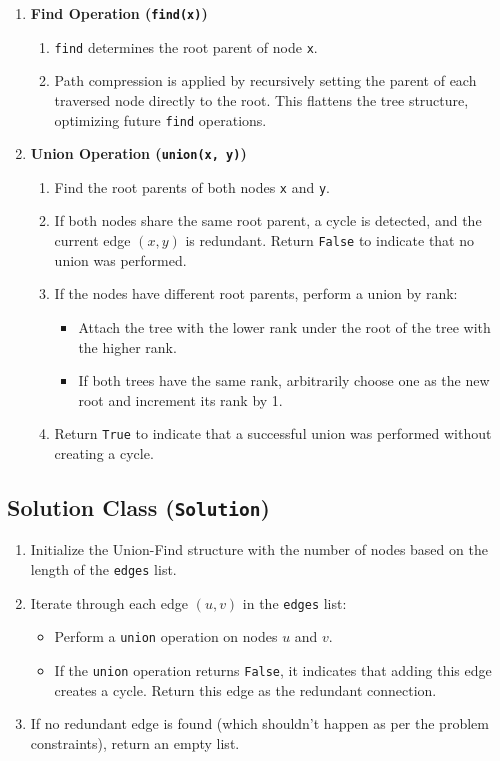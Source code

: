 \begin{enumerate}
    \item \textbf{Find Operation (\texttt{find(x)})}
    \begin{enumerate}
        \item \texttt{find} determines the root parent of node \texttt{x}.
        \item Path compression is applied by recursively setting the parent of each traversed node directly to the root. This flattens the tree structure, optimizing future \texttt{find} operations.
    \end{enumerate}
    
    \item \textbf{Union Operation (\texttt{union(x, y)})}
    \begin{enumerate}
        \item Find the root parents of both nodes \texttt{x} and \texttt{y}.
        \item If both nodes share the same root parent, a cycle is detected, and the current edge \((x, y)\) is redundant. Return \texttt{False} to indicate that no union was performed.
        \item If the nodes have different root parents, perform a union by rank:
        \begin{itemize}
            \item Attach the tree with the lower rank under the root of the tree with the higher rank.
            \item If both trees have the same rank, arbitrarily choose one as the new root and increment its rank by 1.
        \end{itemize}
        \item Return \texttt{True} to indicate that a successful union was performed without creating a cycle.
    \end{enumerate}
\end{enumerate}

\subsection*{Solution Class (\texttt{Solution})}

\begin{enumerate}
    \item Initialize the Union-Find structure with the number of nodes based on the length of the \texttt{edges} list.
    \item Iterate through each edge \((u, v)\) in the \texttt{edges} list:
    \begin{itemize}
        \item Perform a \texttt{union} operation on nodes \(u\) and \(v\).
        \item If the \texttt{union} operation returns \texttt{False}, it indicates that adding this edge creates a cycle. Return this edge as the redundant connection.
    \end{itemize}
    \item If no redundant edge is found (which shouldn't happen as per the problem constraints), return an empty list.
\end{enumerate}

